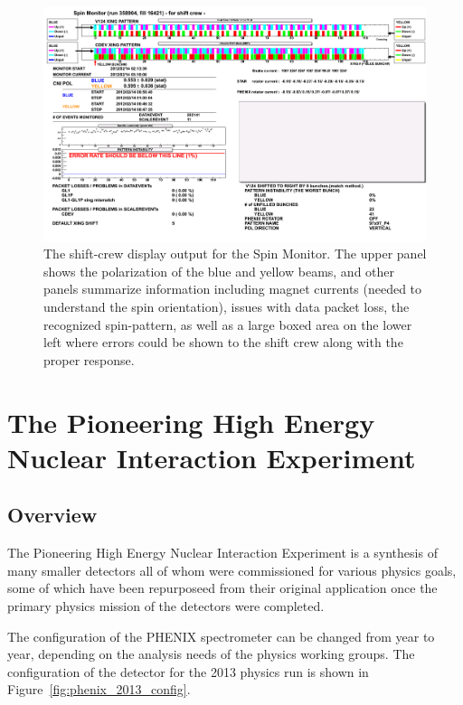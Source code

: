 \begin{figure}
  \centering
  \includegraphics[width=\linewidth]{./figures/SPINMON_shift_358904.png}
  \caption{
    The shift-crew display output for the Spin Monitor. The upper panel shows
    the polarization of the blue and yellow beams, and other panels summarize
    information including magnet currents (needed to understand the spin
    orientation), issues with data packet loss, the recognized spin-pattern, as
    well as a large boxed area on the lower left where errors could be shown to
    the shift crew along with the proper response.
  }
  \label{fig:spin_monitor}

\end{figure}


\clearpage
\section{The Pioneering High Energy Nuclear Interaction Experiment}
\label{sec:PHENIX}
\subsection{Overview}

The Pioneering High Energy Nuclear Interaction Experiment is a synthesis of many
smaller detectors all of whom were commissioned for various physics goals, some
of which have been repurposeed from their original application once the primary
physics mission of the detectors were completed.

The configuration of the PHENIX spectrometer can be changed from year to year,
depending on the analysis needs of the physics working groups. The configuration
of the detector for the 2013 physics run is shown in
Figure~\ref{fig:phenix_2013_config}.

